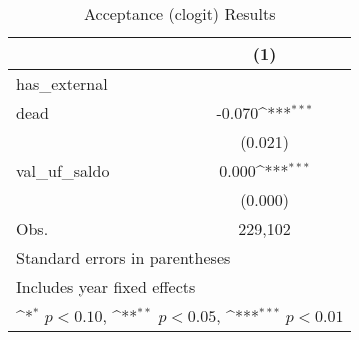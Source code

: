 \begin{table}[htbp]\centering
\def\sym#1{\ifmmode^{#1}\else\(^{#1}\)\fi}
\caption{Acceptance (clogit) Results}
\begin{tabular}{l*{1}{c}}
\hline\hline
                    &\multicolumn{1}{c}{(1)}         \\
\hline
has\_external        &                     \\
dead                &      -0.070\sym{***}\\
                    &     (0.021)         \\
[1em]
val\_uf\_saldo        &       0.000\sym{***}\\
                    &     (0.000)         \\
\hline
Obs.                &     229,102         \\
\hline\hline
\multicolumn{2}{l}{\footnotesize Standard errors in parentheses}\\
\multicolumn{2}{l}{\footnotesize Includes year fixed effects}\\
\multicolumn{2}{l}{\footnotesize \sym{*} \(p<0.10\), \sym{**} \(p<0.05\), \sym{***} \(p<0.01\)}\\
\end{tabular}
\end{table}
